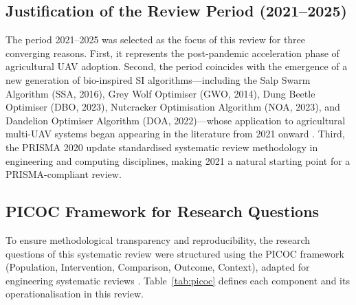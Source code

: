 \documentclass[review,3p]{elsarticle}
\begin{document}
\subsection{Justification of the Review Period (2021--2025)}

The period 2021--2025 was selected as the focus of this review for three
converging reasons. First, it represents the post-pandemic acceleration phase
of agricultural UAV adoption. Second, the period coincides with the emergence
of a new generation of bio-inspired SI algorithms---including the Salp Swarm
Algorithm (SSA, 2016), Grey Wolf Optimiser (GWO, 2014), Dung Beetle Optimiser
(DBO, 2023), Nutcracker Optimisation Algorithm (NOA, 2023), and Dandelion
Optimiser Algorithm (DOA, 2022)---whose application to agricultural multi-UAV
systems began appearing in the literature from 2021 onward \cite{xiao2025}.
Third, the PRISMA 2020 update \cite{page2021} standardised systematic review
methodology in engineering and computing disciplines, making 2021 a natural
starting point for a PRISMA-compliant review.

\subsection{PICOC Framework for Research Questions}
\label{subsec:picoc}

To ensure methodological transparency and reproducibility, the research
questions of this systematic review were structured using the PICOC framework
(Population, Intervention, Comparison, Outcome, Context), adapted for
engineering systematic reviews \cite{brambilla2013,bayindir2016}.
Table~\ref{tab:picoc} defines each component and its operationalisation in
this review.
\end{document}
